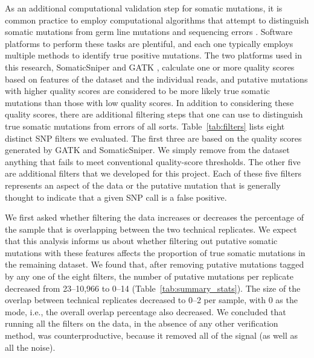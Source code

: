 \documentclass[11pt]{article} %
\begin{document}
As an additional computational validation step for somatic mutations, it is common practice to employ computational algorithms that attempt to distinguish somatic mutations from germ line mutations and sequencing errors \citep{SomaticSniper, mut_calling}. Software platforms to perform these tasks are plentiful, and each one typically employs multiple methods to identify true positive mutations. The two platforms used in this research, SomaticSniper \citep{SomaticSniper} and GATK \citep{GATK}, calculate one or more quality scores based on features of the dataset and the individual reads, and putative mutations with higher quality scores are considered to be more likely true somatic mutations than those with low quality scores. In addition to considering these quality scores, there are additional filtering steps that one can use to distinguish true somatic mutations from errors of all sorts. Table~\ref{tab:filters} lists eight distinct SNP filters we evaluated. The first three are based on the quality scores generated by GATK and SomaticSniper.  We simply remove from the dataset anything that fails to meet conventional quality-score thresholds. The other five are additional filters that we developed for this project. Each of these five filters represents an aspect of the data or the putative mutation that is generally thought to indicate that a given SNP call is a false positive.

We first asked whether filtering the data increases or decreases the percentage of the sample that is overlapping between the two technical replicates. We expect that this analysis informs us about whether filtering out putative somatic mutations with these features affects the proportion of true somatic mutations in the remaining dataset. We found that, after removing putative mutations tagged by any one of the eight filters, the number of putative mutations per replicate decreased from 23--10,966 to 0--14 (Table~\ref{tab:summary_stats}). The size of the overlap between technical replicates decreased to 0--2 per sample, with 0 as the mode, i.e., the overall overlap percentage also decreased. We concluded that running all the filters on the data, in the absence of any other verification method, was counterproductive, because it removed all of the signal (as well as all the noise). 
\end{document}
